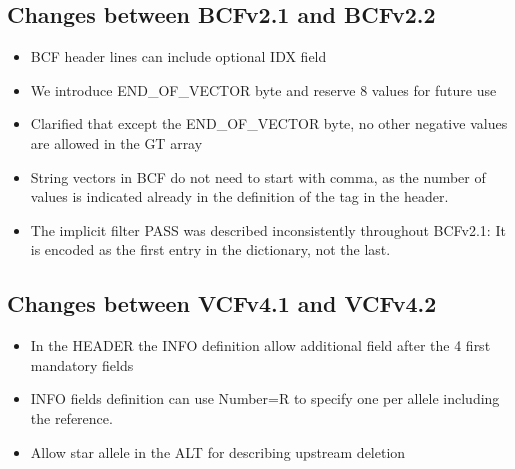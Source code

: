 \documentclass[8pt]{article}
\begin{document}
\subsection{Changes between BCFv2.1 and BCFv2.2}
\begin{itemize}
\item BCF header lines can include optional IDX field
\item We introduce END\_OF\_VECTOR byte and reserve 8 values for future use
\item Clarified that except the END\_OF\_VECTOR byte, no other negative values are allowed in the GT array 
\item String vectors in BCF do not need to start with comma, as the number of values is indicated already in the definition of the tag in the header.
\item The implicit filter PASS was described inconsistently throughout BCFv2.1: It is encoded as the first entry in the dictionary, not the last.
\end{itemize}

\subsection{Changes between VCFv4.1 and VCFv4.2}
\begin{itemize}
\item In the HEADER the INFO definition allow additional field after the 4 first mandatory fields
\item INFO fields definition can use Number=R to specify one per allele including the reference.
\item Allow star allele in the ALT for describing upstream deletion
\end{itemize}
\end{document}
